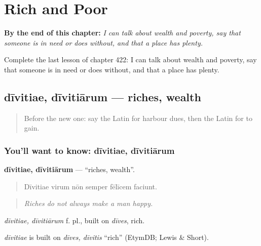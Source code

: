 
\chapter{Rich and Poor}
\label{ch:la-rich-and-poor}

\begin{chapteropening}
\textbf{By the end of this chapter:} \emph{I can talk about wealth and poverty, say that someone is in need or does without, and that a place has plenty.}

Complete the last lesson of chapter 422: I can talk about wealth and poverty, say that someone is in need or does without, and that a place has plenty.
\end{chapteropening}

\section[dīvitiae, dīvitiārum]{dīvitiae, dīvitiārum — riches, wealth}

\label{lesson:LA-C422-divitiae}



\begin{quote}
Before the new one: say the Latin for harbour dues, then the Latin for to gain.
\end{quote}

\subsection*{You'll want to know: dīvitiae, dīvitiārum}
\textbf{dīvitiae, dīvitiārum} — \textquotedblleft{}riches, wealth\textquotedblright{}.

\begin{quote}
Dīvitiae virum nōn semper fēlīcem faciunt.
\end{quote}

\begin{quote}
\emph{Riches do not always make a man happy.}
\end{quote}

\emph{dīvitiae, dīvitiārum} f. pl., built on \emph{dīves}, rich.

\begin{cousinweb}
\emph{dīvitiae} is built on \emph{dīves, dīvitis} \textquotedblleft{}rich\textquotedblright{} (EtymDB; Lewis \& Short).
\end{cousinweb}

